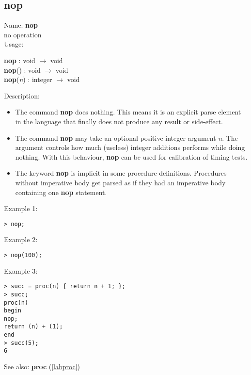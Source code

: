 \subsection{nop}
\label{labnop}
\noindent Name: \textbf{nop}\\
no operation\\
\noindent Usage: 
\begin{center}
\textbf{nop} : \textsf{void} $\rightarrow$ \textsf{void}\\
\textbf{nop}() : \textsf{void} $\rightarrow$ \textsf{void}\\
\textbf{nop}(\emph{n}) : \textsf{integer} $\rightarrow$ \textsf{void}\\
\end{center}
\noindent Description: \begin{itemize}

\item The command \textbf{nop} does nothing. This means it is an explicit parse
   element in the \sollya language that finally does not produce any
   result or side-effect.

\item The command \textbf{nop} may take an optional positive integer argument \emph{n}. The argument controls how much (useless) integer additions \sollya performs while doing nothing. 
   With this behaviour, \textbf{nop} can be used for calibration of timing tests.

\item The keyword \textbf{nop} is implicit in some procedure
   definitions. Procedures without imperative body get parsed as if they
   had an imperative body containing one \textbf{nop} statement.
\end{itemize}
\noindent Example 1: 
\begin{center}\begin{minipage}{15cm}\begin{Verbatim}[frame=single]
> nop;
\end{Verbatim}
\end{minipage}\end{center}
\noindent Example 2: 
\begin{center}\begin{minipage}{15cm}\begin{Verbatim}[frame=single]
> nop(100);
\end{Verbatim}
\end{minipage}\end{center}
\noindent Example 3: 
\begin{center}\begin{minipage}{15cm}\begin{Verbatim}[frame=single]
> succ = proc(n) { return n + 1; };
> succ;
proc(n)
begin
nop;
return (n) + (1);
end
> succ(5);
6
\end{Verbatim}
\end{minipage}\end{center}
See also: \textbf{proc} (\ref{labproc})
